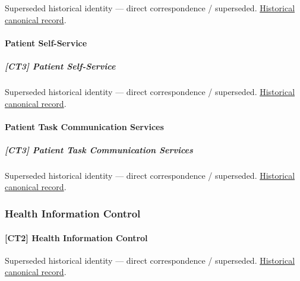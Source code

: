 \par\label{element:35c5be472bf2433fbbde9646d87aefb3}
Superseded historical identity — direct correspondence / superseded. \href{../../../../continuum/strategy/capability/35c5be472bf2433fbbde9646d87aefb3.md}{Historical canonical record}.\par

\paragraph{Patient Self-Service}

\subparagraph{[CT3] Patient Self-Service}

\par\label{element:60f427e6b5764757b909624085a2af89}
Superseded historical identity — direct correspondence / superseded. \href{../../../../continuum/strategy/capability/60f427e6b5764757b909624085a2af89.md}{Historical canonical record}.\par

\paragraph{Patient Task Communication Services}

\subparagraph{[CT3] Patient Task Communication Services}

\par\label{element:0914f2bb267449e282e9ae0f7407d9fe}
Superseded historical identity — direct correspondence / superseded. \href{../../../../continuum/strategy/capability/0914f2bb267449e282e9ae0f7407d9fe.md}{Historical canonical record}.\par

\subsubsection{Health Information Control}

\paragraph{[CT2] Health Information Control}

\par\label{element:a3196aef21d443519de874c24f64a185}
Superseded historical identity — direct correspondence / superseded. \href{../../../../continuum/strategy/capability/a3196aef21d443519de874c24f64a185.md}{Historical canonical record}.\par

